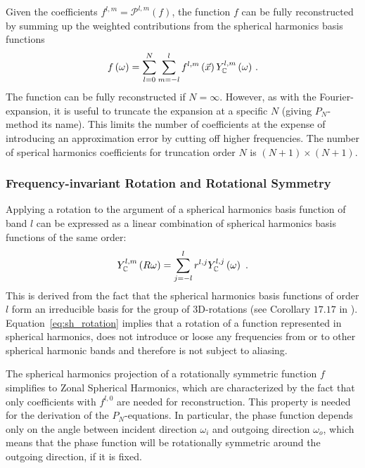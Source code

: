 Given the coefficients $f^{l, m} = \mathcal{P}^{l, m}(f)$, the function $f$ can be fully reconstructed by summing up the weighted contributions from the spherical harmonics basis functions
\begin{align}
\label{eq:sh_reconstruction}
f\left(\omega\right) = 
\sum_{l=0}^{N}
{
\sum_{m=-l}^{l}
{
f^{l,m}\left(\vec{x}\right)Y_{\mathbb{C}}^{l,m}\left(\omega\right)
}
}
\ .
\end{align}
The function can be fully reconstructed if $N=\infty$. However, as with the Fourier-expansion, it is useful to truncate the expansion at a specific $N$ (giving $P_N$-method its name). This limits the number of coefficients at the expense of introducing an approximation error by cutting off higher frequencies. The number of sperical harmonics coefficients for truncation order $N$ is $(N+1)\times(N+1)$.

\subsubsection*{Frequency-invariant Rotation and Rotational Symmetry}

Applying a rotation to the argument of a spherical harmonics basis function of band $l$ can be expressed as a linear combination of spherical harmonics basis functions of the same order:
\begin{align}
\label{eq:sh_rotation}
Y_{\mathbb{C}}^{l,m}\left(R\omega\right)=\sum_{j=-l}^{l}r^{l,j}Y_{\mathbb{C}}^{l,j}\left(\omega\right)
\ .
\end{align}
This is derived from the fact that the spherical harmonics basis functions of order $l$ form an irreducible basis for the group of 3D-rotations (see Corollary $17.17$ in \cite{Hall13}). Equation~\ref{eq:sh_rotation} implies that a rotation of a function represented in spherical harmonics, does not introduce or loose any frequencies from or to other spherical harmonic bands and therefore is not subject to aliasing.

The spherical harmonics projection of a rotationally symmetric function $f$ simplifies to Zonal Spherical Harmonics, which are characterized by the fact that only coefficients with $f^{l,0}$ are needed for reconstruction. This property is needed for the derivation of the $P_N$-equations. In particular, the phase function depends only on the angle between incident direction $\omega_i$ and outgoing direction $\omega_o$, which means that the phase function will be rotationally symmetric around the outgoing direction, if it is fixed. 

